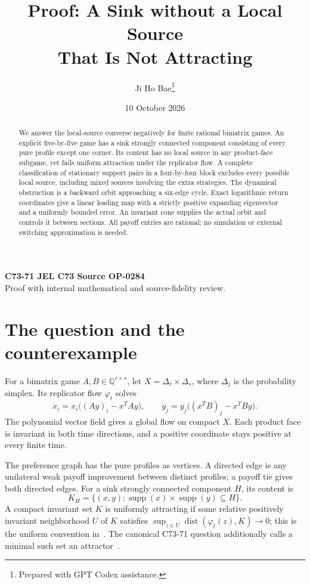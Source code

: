 \documentclass[11pt,a4paper]{article}
\title{Proof: A Sink without a Local Source\\
That Is Not Attracting}
\author{Ji Ho Bae\thanks{Prepared with GPT Codex assistance.}}
\date{10 October 2026}
\numberwithin{equation}{section}
\theoremstyle{definition}
\newcommand{\Q}{\mathbb Q}
\DeclareMathOperator{\supp}{supp}
\DeclareMathOperator{\dist}{dist}
\begin{document}
\maketitle
\begin{center}
\small\textbf{C73-71 \quad JEL C73 \quad Source OP-0284}\\
Proof with internal mathematical and source-fidelity review.
\end{center}
\begin{abstract}
We answer the local-source converse negatively for finite rational
bimatrix games. An explicit five-by-five game has a sink strongly
connected component consisting of every pure profile except one corner.
Its content has no local source in any product-face subgame, yet fails
uniform attraction under the replicator flow. A complete classification
of stationary support pairs in a four-by-four block excludes every
possible local source, including mixed sources involving the extra
strategies. The dynamical obstruction is a backward orbit approaching
a six-edge cycle. Exact logarithmic return coordinates give a linear
leading map with a strictly positive expanding eigenvector and a
uniformly bounded error. An invariant cone supplies the actual orbit
and controls it between sections. All payoff entries are rational;
no simulation or external switching approximation is needed.
\end{abstract}

\section{The question and the counterexample}\label{sec:question}

For a bimatrix game \(A,B\in\Q^{r\times s}\), let
\(X=\Delta_r\times\Delta_s\), where \(\Delta_j\) is the probability
simplex. Its replicator flow \(\varphi_t\) solves
\begin{equation}\label{eq:replicator}
 \dot x_i=x_i\bigl((Ay)_i-x^TAy\bigr),\qquad
 \dot y_j=y_j\bigl((x^TB)_j-x^TBy\bigr).
\end{equation}
The polynomial vector field gives a global flow on compact \(X\).
Each product face is invariant in both time directions, and a positive
coordinate stays positive at every finite time.

The preference graph has the pure profiles as vertices. A directed
edge is any unilateral weak payoff improvement between distinct
profiles; a payoff tie gives both directed edges. For a sink strongly
connected component \(H\), its content is
\[
 K_H=\{(x,y):\supp(x)\times\supp(y)\subseteq H\}.
\]
A compact invariant set \(K\) is uniformly attracting if some relative
positively invariant neighborhood \(U\) of \(K\) satisfies
\(\sup_{z\in U}\dist(\varphi_t(z),K)\to0\); this is the uniform
convention in~\cite[Definition 3.2]{BS}. The canonical C73-71 question
additionally calls a minimal such set an attractor~\cite{catalogue}.
\end{document}
